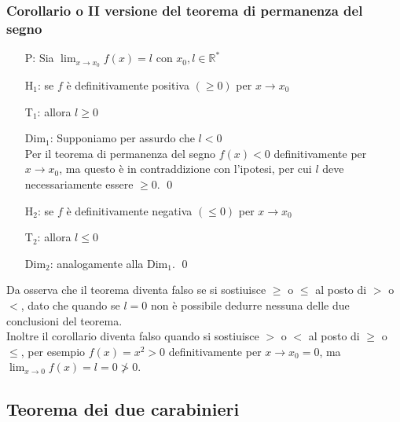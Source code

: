 \documentclass[a4paper]{article}
\begin{document}
\subsubsection*{Corollario o II versione del teorema di permanenza del segno}
\begin{itemize}
	\item[P: ] Sia \(\displaystyle \lim_{x \to x_0} f(x) = l\) con \(x_0, l \in \mathbb{R}^*\)
	\item[H\(_1\): ] se \(f\) è definitivamente positiva \(\left( \geq 0 \right)\) per \(x \to x_0\)
	\item[T\(_1\): ] allora \(l \geq 0\)
	\item[Dim\(_1\): ] Supponiamo per assurdo che \(l < 0\) \\
	Per il teorema di permanenza del segno \(f(x) < 0\) definitivamente per \(x \to x_0\), ma questo è in contraddizione con l'ipotesi,
	per cui \(l\) deve necessariamente essere \(\geq 0\). \qed

	\item[H\(_2\): ] se \(f\) è definitivamente negativa \(\left( \leq 0 \right)\) per \(x \to x_0\)
	\item[T\(_2\): ] allora \(l \leq 0\)
	\item[Dim\(_2\): ] analogamente alla Dim\(_1\). \qed
\end{itemize}
Da osserva che il teorema diventa falso se si sostiuisce \(\geq\) o \(\leq\) al posto di \(>\) o \(<\), dato che quando se \(l = 0\) non è possibile dedurre nessuna delle due conclusioni del teorema. \\
Inoltre il corollario diventa falso quando si sostiuisce \(>\) o \(<\) al posto di \(\geq\) o \(\leq\), per esempio \(f(x) = x^2 > 0\) definitivamente per \(x \to x_0 = 0\), ma \(\displaystyle \lim_{x \to 0} f(x) = l = 0 \ngtr 0\).

\newpage


\subsection{Teorema dei due carabinieri}
\end{document}
